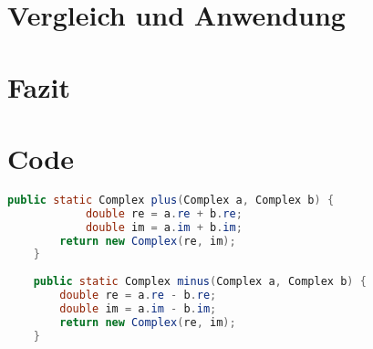 \documentclass[12pt]{article}
\begin{document}
\section{Vergleich und Anwendung}

\section{Fazit}

\section{Code}

\begin{lstlisting}[language=Java, title={Complex.java: Z. 19-29}]
    public static Complex plus(Complex a, Complex b) {
            double re = a.re + b.re;
            double im = a.im + b.im;
        return new Complex(re, im);
    }
    
    public static Complex minus(Complex a, Complex b) {
        double re = a.re - b.re;
        double im = a.im - b.im;
        return new Complex(re, im);
    }
    \end{lstlisting}
    
\end{document}
